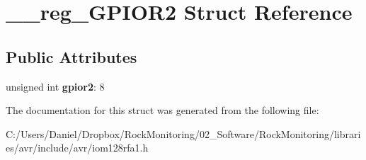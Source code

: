 \hypertarget{struct____reg___g_p_i_o_r2}{}\section{\+\_\+\+\_\+reg\+\_\+\+G\+P\+I\+O\+R2 Struct Reference}
\label{struct____reg___g_p_i_o_r2}
\subsection*{Public Attributes}
\begin{DoxyCompactItemize}
\item 
unsigned int {\bfseries gpior2}\+: 8\hypertarget{struct____reg___g_p_i_o_r2_a8a29cdaa9e80dbed503e3625aee29162}{}\label{struct____reg___g_p_i_o_r2_a8a29cdaa9e80dbed503e3625aee29162}

\end{DoxyCompactItemize}


The documentation for this struct was generated from the following file\+:\begin{DoxyCompactItemize}
\item 
C\+:/\+Users/\+Daniel/\+Dropbox/\+Rock\+Monitoring/02\+\_\+\+Software/\+Rock\+Monitoring/libraries/avr/include/avr/iom128rfa1.\+h\end{DoxyCompactItemize}
